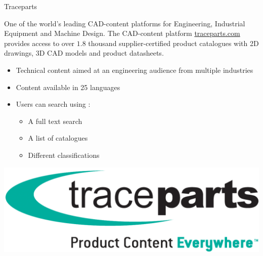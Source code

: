 \begin{frame}{Traceparts}

    \begin{center}
        One of the world's leading CAD-content platforms for Engineering, Industrial Equipment and Machine Design. The CAD-content platform \href{http://traceparts.com/}{traceparts.com} provides access to over $1.8$ thousand supplier-certified product catalogues with 2D drawings, 3D CAD models and product datasheets.
    \end{center}

    \begin{itemize}
        \item Technical content aimed at an engineering audience from multiple industries
        \item Content available in 25 languages
        \item Users can search using :
        \begin{itemize}
            \item A full text search
            \item A list of catalogues
            \item Different classifications
        \end{itemize}
    \end{itemize}
    
    \begin{center}
        \includegraphics[scale=0.1]{images/traceparts_logo.png}
    \end{center}
    
\end{frame}